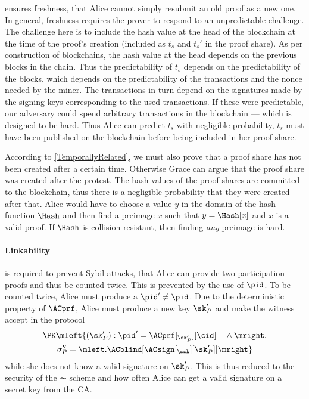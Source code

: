  ensures freshness, \ie that Alice cannot simply 
resubmit an old proof as a new one.
In general, freshness requires the prover to respond to an unpredictable 
challenge.
The challenge here is to include the hash value at the head of the blockchain at 
the time of the proof's creation (included as \(t_s\) and \(t_s'\) in the proof 
share).
As per construction of blockchains, the hash value at the head depends on the 
previous blocks in the chain.
Thus the predictability of \(t_s\) depends on the predictability of the blocks, 
which depends on the predictability of the transactions and the nonce needed by 
the miner.
The transactions in turn depend on the signatures made by the signing keys 
corresponding to the used transactions.
If these were predictable, our adversary could spend arbitrary transactions in 
the blockchain --- which is designed to be hard.
Thus Alice can predict \(t_s\) with negligible probability, \ie \(t_s\) must 
have been published on the blockchain before being included in her proof share.

According to \cref{TemporallyRelated}, we must also prove that a proof share has 
not been created after a certain time.
Otherwise Grace can argue that the proof share was created after the protest.
The hash values of the proof shares are committed to the blockchain, thus there 
is a negligible probability that they were created after that.
Alice would have to choose a value \(y\) in the domain of the hash function 
\(\Hash\) and then find a preimage \(x\) such that \(y = \Hash[x]\) and \(x\) is 
a valid proof.
If \(\Hash\) is collision resistant, then finding \emph{any} preimage is hard.

\paragraph{Linkability}%
\label{analysis-linkability}

 is required to prevent Sybil attacks, \ie that Alice can 
provide two participation proofs and thus be counted twice.
This is prevented by the use of \(\pid\).
To be counted twice, Alice must produce a \(\pid'\neq \pid\).
Due to the deterministic property of \(\ACprf\), Alice must produce a new key 
\(\sk_P'\) and make the witness accept in the protocol
\begin{multline*}
\PK\mleft\{ (\sk_P') : \pid' = \ACprf[_{\sk_P'}][\cid] \quad \land \mright. \\
    \sigma_P'' = \mleft. \ACblind[\ACsign[_{\ssk}][\sk_P']] \mright\}
\end{multline*}
while she does not know a valid signature on \(\sk_P'\).
This is thus reduced to the security of the \(\AC\) scheme and how often Alice 
can get a valid signature on a secret key from the \ac{CA}.

